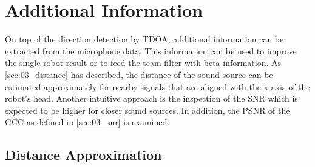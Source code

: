 \newpage
\section{Additional Information}
\label{sec:04_additionalInformation}

On top of the direction detection by \ac{TDOA}, additional information can be
extracted from the microphone data.
This information can be used to improve the single robot result or
to feed the team filter with beta information.
As \cref{sec:03_distance} has described, the distance of the sound source
can be estimated approximately for nearby signals that are aligned with
the x-axis of the robot's head.
Another intuitive approach is the inspection of the \ac{SNR} which
is expected to be higher for closer sound sources.
In addition, the \ac{PSNR} of the \ac{GCC} as defined in \cref{sec:03_snr} is examined.

\subsection{Distance Approximation}
\label{subsec:04_distance}

